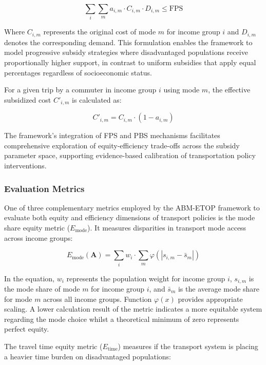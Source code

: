 \documentclass[a4paper,fleqn]{cas-sc}
\begin{document}
\begin{equation}
\sum_{i}\sum_{m}a_{i,m} \cdot C_{i,m} \cdot D_{i,m} \leq \text{FPS}
\end{equation}

Where $C_{i,m}$ represents the original cost of mode $m$ for income group $i$ and $D_{i,m}$ denotes the corresponding demand. This formulation enables the framework to model progressive subsidy strategies where disadvantaged populations receive proportionally higher support, in contrast to uniform subsidies that apply equal percentages regardless of socioeconomic status.

For a given trip by a commuter in income group $i$ using mode $m$, the effective subsidized cost $C'_{i,m}$ is calculated as:

\begin{equation}
C'_{i,m} = C_{i,m} \cdot (1 - a_{i,m})
\end{equation}

The framework's integration of FPS and PBS mechanisms facilitates comprehensive exploration of equity-efficiency trade-offs across the subsidy parameter space, supporting evidence-based calibration of transportation policy interventions.

\subsubsection{Evaluation Metrics}\label{sec:metricequations}

One of three complementary metrics employed by the ABM-ETOP framework to evaluate both equity and efficiency dimensions of transport policies is the mode share equity metric ($E_{\text{mode}}$). It measures disparities in transport mode access across income groups:

\begin{equation}
E_{\text{mode}}(\mathbf{A}) = \sum_{i}w_i \cdot \sum_{m}\varphi(|s_{i,m} - \bar{s}_{m}|)
\end{equation}

In the equation, $w_i$ represents the population weight for income group $i$, $s_{i,m}$  is the mode share of mode $m$ for income group $i$, and $\bar{s}_{m}$ is the average mode share for mode $m$ across all income groups. Function $\varphi(x)$ provides appropriate scaling. A lower calculation result of the metric indicates a more equitable system regarding the mode choice whilst a theoretical minimum of zero represents perfect equity.

The travel time equity metric ($E_{\text{time}}$) measures if the transport system is placing a heavier time burden on disadvantaged populations:
\end{document}
